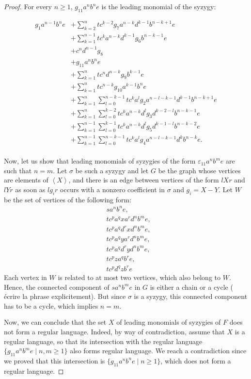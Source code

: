 \documentclass[sigconf]{acmart}
\theoremstyle{plain}
\theoremstyle{definition}
\theoremstyle{remark}
\newcommand\fixmecc[1]{{\color{red}{\underline{\bf C:}} #1}}
\begin{document}
\begin{proof}
  For every $n \geq 1$, $g_{11}a^nb^ne$ is the leading monomial of the syzygy:

  \begin{align*}
    g_1a^{n-1}b^ne & + \sum_{k = 2}^{n} tc^{k - 2}g_7a^{n - k}d^{k - 1}b^{n - k + 1}e \\
    & + \sum_{k = 1}^{n - 1} tc^ka^{n - k}d^{k - 1}g_6b^{n - k - 1}e \\
    & + c^nd^{n - 1}g_8 \\
    & + g_{11}a^nb^ne \\
    & + \sum_{k = 1}^n tc^nd^{n - k}g_9b^{k - 1}e \\
    & + \sum_{k = 1}^n tc^{n - k}g_{10}a^{k - 1}b^ne \\
    & + \sum_{k = 1}^{n} \sum_{l = 0}^{n - k - 1} tc^{k}a^{l}g_2a^{n - l - k - 1}d^{k - 1}b^{n - k + 1} e \\
    & + \sum_{k = 1}^{n} \sum_{l = 0}^{k - 2} tc^{k}a^{n - k}d^lg_3d^{k - 2 - l}b^{n - k - 1}e \\
    & + \sum_{k = 1}^{n - 1} \sum_{l = 0}^{k - 1} tc^{k}a^{n - k}d^lg_5d^{k - 1 - l}b^{n - k - 2}e \\
    & + \sum_{k = 1}^{n - 1} \sum_{l = 0}^{n - k - 1} tc^{k}a^{l}g_4a^{n - l - k - 1}d^{k}b^{n - k} e. \\
  \end{align*}

  Now, let us show that leading monomials of syzygies of the form $\varepsilon_{11}a^nb^me$ are such that $n = m$.
  Let $\sigma$ be such a syzygy and let $G$ be the graph whose vertices are elements of $\left\langle X \right\rangle$, and there is an edge between vertices of the form $lXr$ and $lYr$ as soon as $lg_ir$ occurs with a nonzero coefficient in $\sigma$ and $g_i=X - Y$. Let $W$ be the set of vertices of the following form:
  \begin{align*}
    & sa^nb^ne, \\
    & tc^pa^qxa^rd^nb^me, \\
    & tc^pa^qd^rxd^nb^me, \\
    & tc^pa^qya^rd^nb^me, \\
    & tc^pa^qd^ryd^nb^me, \\
    & tc^pza^qb^re, \\
    & tc^pd^qzb^re
  \end{align*}
  Each vertex in $W$ is related to at most two vertices, which also belong to $W$.
  Hence, the connected component of $sa^nb^me$ in $G$ is either a chain or a cycle (\fixmecc{écrire la phrase explicitement}).
  But since $\sigma$ is a syzygy, this connected component has to be a cycle, which implies $n = m$.

  Now, we can conclude that the set $X$ of leading monomials of syzygies of $F$ does not form a regular language.
  Indeed, by way of contradiction, assume that $X$ is a regular language, so that its
  intersection with the regular language $\{g_{11}a^nb^me \;|\; n, m \geq 1\}$ also forms regular language.
  We reach a contradiction since we proved that this intersection is $\{g_{11}a^nb^ne \;|\; n \geq 1 \}$, which does not form a regular language.
\end{proof}
\end{document}

